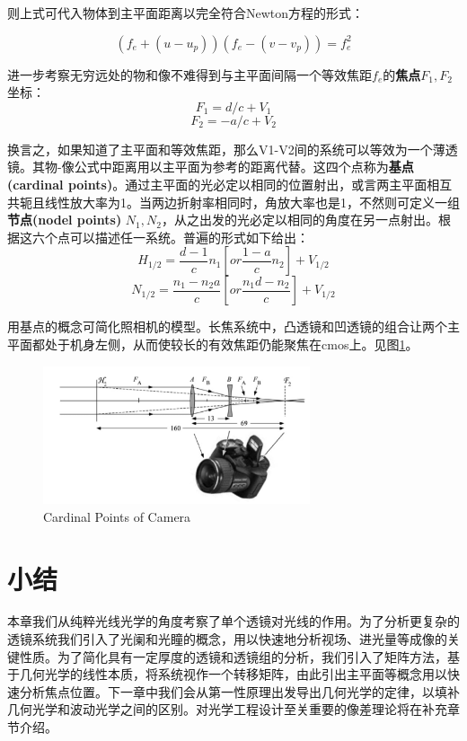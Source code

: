 \documentclass[12pt]{ctexart}%
\begin{document}
则上式可代入物体到主平面距离以完全符合Newton方程的形式：
\begin{framed}
    \begin{equation}
        (f_e+(u-u_p))(f_e-(v-v_p))=f_{e}^2
    \end{equation}
\end{framed}
\noindent 进一步考察无穷远处的物和像不难得到与主平面间隔一个等效焦距$f_e$的\textbf{焦点}$F_1,F_2$坐标：
\begin{equation}
    F_1=d/c+V_1
\end{equation}
\begin{equation}
    F_2=-a/c+V_2
\end{equation}
\par 换言之，如果知道了主平面和等效焦距，那么V1-V2间的系统可以等效为一个薄透镜。其物-像公式中距离用以主平面为参考的距离代替。这四个点称为\textbf{基点(cardinal points)}。通过主平面的光必定以相同的位置射出，或言两主平面相互共轭且线性放大率为1。当两边折射率相同时，角放大率也是1，不然则可定义一组\textbf{节点(nodel points)} $N_1,N_2$，从之出发的光必定以相同的角度在另一点射出。根据这六个点可以描述任一系统。普遍的形式如下给出：
\begin{equation}
    {H}_{1/2}=\frac{d-1}{c}n_1[or \frac{1-a}{c}n_2]+V_{1/2}
\end{equation}
\begin{equation}
    {N}_{1/2}=\frac{n_1-n_2a}{c}[or \frac{n_1d-n_2}{c}]+V_{1/2}
\end{equation}
\par 用基点的概念可简化照相机的模型。长焦系统中，凸透镜和凹透镜的组合让两个主平面都处于机身左侧，从而使较长的有效焦距仍能聚焦在cmos上。见图\ref{camera}。
\begin{figure}[t] %
    \centering
    \includegraphics[width=0.7\textwidth]{Image/2_Camera.png}
    \caption{Cardinal Points of Camera}
    \label{camera}
\end{figure}
\section*{小结}
本章我们从纯粹光线光学的角度考察了单个透镜对光线的作用。为了分析更复杂的透镜系统我们引入了光阑和光瞳的概念，用以快速地分析视场、进光量等成像的关键性质。为了简化具有一定厚度的透镜和透镜组的分析，我们引入了矩阵方法，基于几何光学的线性本质，将系统视作一个转移矩阵，由此引出主平面等概念用以快速分析焦点位置。下一章中我们会从第一性原理出发导出几何光学的定律，以填补几何光学和波动光学之间的区别。对光学工程设计至关重要的像差理论将在补充章节介绍。
\end{document}
